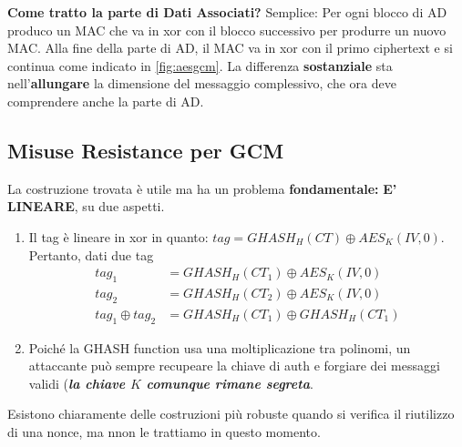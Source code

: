 \begin{remark}\textbf{Come tratto la parte di Dati Associati?}
Semplice: Per ogni blocco di AD produco un MAC che va in xor con il blocco successivo per produrre un nuovo MAC. Alla fine della parte di AD, il MAC va in xor con il primo ciphertext e si continua come indicato in \cref{fig:aesgcm}. La differenza \textbf{sostanziale} sta nell'\textbf{allungare} la dimensione del messaggio complessivo, che ora deve comprendere anche la parte di AD.
\end{remark}

\subsection{Misuse Resistance per GCM}
La costruzione trovata è utile ma ha un problema \textbf{fondamentale:} \textbf{E' LINEARE}, su due aspetti. 
\begin{enumerate}
    \item Il tag è lineare in xor in quanto: $tag=GHASH_H(CT)\oplus{AES_K(IV,0)}$. Pertanto, dati due tag
    \begin{equation*}
        \begin{aligned}
            tag_1&=GHASH_H(CT_1)\oplus{AES_K(IV,0)}\\
            tag_2&=GHASH_H(CT_2)\oplus{AES_K(IV,0)}\\
            tag_1\oplus{tag_2}&=GHASH_H(CT_1)\oplus{GHASH_H(CT_1)}
        \end{aligned}
    \end{equation*}
    \item Poiché la GHASH function usa una moltiplicazione tra polinomi, un attaccante può sempre recupeare la chiave di auth e forgiare dei messaggi validi (\textit{\textbf{la chiave $K$ comunque rimane segreta}}.
\end{enumerate}
Esistono chiaramente delle costruzioni più robuste quando si verifica il riutilizzo di una nonce, ma nnon le trattiamo in questo momento.